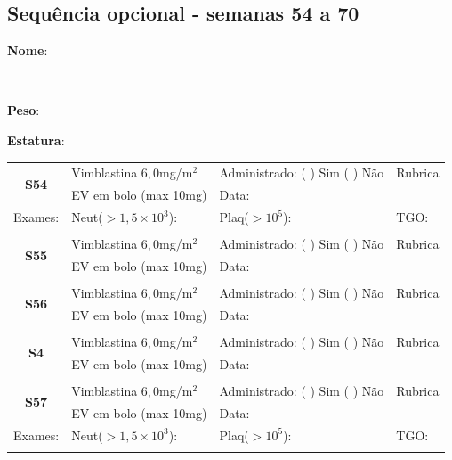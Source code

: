 \documentclass[11pt,a4paper,oldfontcommands]{memoir}
\def\entrywithlabel[#1]#2{\parbox{#1}{{\small #2:} \hrulefill}}
\begin{document}
\subsection{Sequência opcional - semanas 54 a 70}
\begin{center}

\noindent
\entrywithlabel[1\hsize]{\textbf{Nome}}\hfill
\\[0.3cm]
\entrywithlabel[.45\hsize]{\textbf{Peso}}\hfill  \entrywithlabel[.45\hsize]{\textbf{Estatura}}

\begin{table}[H]
\begin{tabular}{p{}p{}|p{}|p{3cm}}
    \hline
    \multicolumn{1}{c|}{\multirow{2}{*}{\textbf{S54}}}&{Vimblastina \(6,0\)mg/m\(^2\)}&{Administrado: (  ) Sim (  ) Não}&{Rubrica}\\
    \multicolumn{1}{c|}{}&{EV em bolo (max 10mg)}&{Data:}&\\
    \hline
    {Exames:}&{Neut(\(>1,5\times10^3\)):}&{Plaq(\(>10^5\)):}&{TGO:}
    \\
    \hline
    \\
    \hline
    \multicolumn{1}{c|}{\multirow{2}{*}{\textbf{S55}}}&{Vimblastina \(6,0\)mg/m\(^2\)}&{Administrado: (  ) Sim (  ) Não}&{Rubrica}\\
    \multicolumn{1}{c|}{}&{EV em bolo (max 10mg)}&{Data:}&\\
   \\
    \hline
    \multicolumn{1}{c|}{\multirow{2}{*}{\textbf{S56}}}&{Vimblastina \(6,0\)mg/m\(^2\)}&{Administrado: (  ) Sim (  ) Não}&{Rubrica}\\
    \multicolumn{1}{c|}{}&{EV em bolo (max 10mg)}&{Data:}&\\
    \hline
    \\
    \hline
    \multicolumn{1}{c|}{\multirow{2}{*}{\textbf{S4}}}&{Vimblastina \(6,0\)mg/m\(^2\)}&{Administrado: (  ) Sim (  ) Não}&{Rubrica}\\
    \multicolumn{1}{c|}{}&{EV em bolo (max 10mg)}&{Data:}&\\
    \hline
    \\
    \hline
    \multicolumn{1}{c|}{\multirow{2}{*}{\textbf{S57}}}&{Vimblastina \(6,0\)mg/m\(^2\)}&{Administrado: (  ) Sim (  ) Não}&{Rubrica}\\
    \multicolumn{1}{c|}{}&{EV em bolo (max 10mg)}&{Data:}&\\
    \hline
    {Exames:}&{Neut(\(>1,5\times10^3\)):}&{Plaq(\(>10^5\)):}&{TGO:}
    \\
    \hline\\

\end{tabular}
\end{table}
\end{center}
\end{document}

